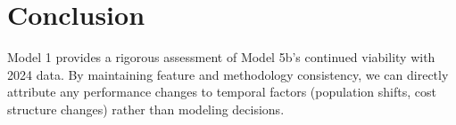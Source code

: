     

\section{Conclusion}

Model 1 provides a rigorous assessment of Model 5b's continued viability with 2024 data. By maintaining feature and methodology consistency, we can directly attribute any performance changes to temporal factors (population shifts, cost structure changes) rather than modeling decisions.

